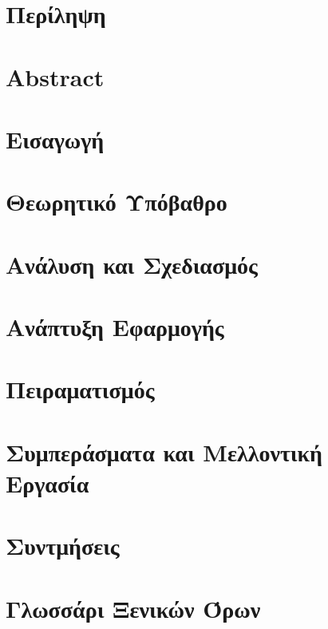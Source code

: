 \documentclass[a4paper,11pt,oneside,openany]{ioniothesis}
\begin{document}
\chapter*{Περίληψη} \pagestyle{headings}


\chapter*{Abstract} \pagestyle{headings}

\tableofcontents

\cleardoublepage

\listoffigures
\cleardoublepage
\listoftables

\newpage
{}

\chapter{Εισαγωγή} \label{chapter:intro}


\chapter{Θεωρητικό Υπόβαθρο}


\chapter{Ανάλυση και Σχεδιασμός}


\chapter{Ανάπτυξη Εφαρμογής}


\chapter{Πειραματισμός}


\chapter{Συμπεράσματα και Μελλοντική Εργασία}


\printbibliography %

\chapter*{Συντμήσεις} \pagestyle{empty}



\chapter*{Γλωσσάρι Ξενικών Όρων} \pagestyle{empty}

\end{document}
